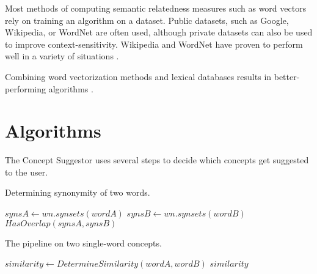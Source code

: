 \documentclass{article}
\begin{document}
Most methods of computing semantic relatedness measures such as word vectors rely on training an algorithm on a dataset. Public datasets, such as Google, Wikipedia, or WordNet are often used, although private datasets can also be used to improve context-sensitivity. Wikipedia and WordNet have proven to perform well in a variety of situations \citep{strube2006wikirelate}. %

Combining word vectorization methods and lexical databases results in better-performing algorithms \cite{lee2016combining}.

\section{Algorithms}

The Concept Suggestor uses several steps to decide which concepts get suggested to the user. 

\begin{algorithm}
\caption{Determining synonymity of two words.}\label{al:synonymity}
\begin{algorithmic}[1]
		\State $\textit{synsA} \gets \textit{wn.synsets}(wordA)$
		\State $\textit{synsB} \gets \textit{wn.synsets}(wordB)$
		\State \Return $\textit{HasOverlap}(synsA, synsB)$
	\EndProcedure
\end{algorithmic}
\end{algorithm}

\begin{algorithm}
\caption{The pipeline on two single-word concepts.}\label{al:twowordpipeline}
\begin{algorithmic}[1]
		\State $\textit{similarity} \gets \textit{DetermineSimilarity}(wordA, wordB)$
				\State {}
			\EndIf
		\EndIf
		\State \Return $\textit{similarity}$
	\EndProcedure
\end{algorithmic}
\end{algorithm}

\end{document}

